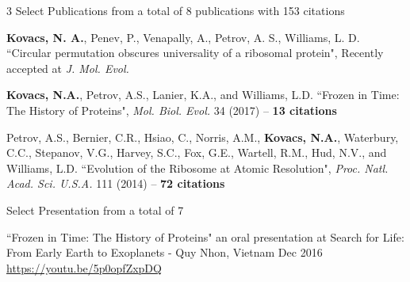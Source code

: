 

\begin{cventries}

  \cventry
  	{3 Select Publications from a total of 8 publications with 153 citations} %
    {} %
    {} %
    {} %
    {\begin{cvitems}
    \item {\bf Kovacs, N. A.}, Penev, P., Venapally, A., Petrov, A. S., Williams, L. D. ``Circular permutation obscures universality of a ribosomal protein",  Recently accepted at \textit{J. Mol. Evol.}
    \item {\bf Kovacs, N.A.}, Petrov, A.S., Lanier, K.A., and Williams, L.D. ``Frozen in Time: The History of Proteins", \textit{Mol. Biol. Evol.} 34 (2017) -- {\bf 13 citations}
    \item Petrov, A.S., Bernier, C.R., Hsiao, C., Norris, A.M., {\bf Kovacs, N.A.}, Waterbury, C.C., Stepanov, V.G., Harvey, S.C., Fox, G.E., Wartell, R.M., Hud, N.V., and Williams, L.D. ``Evolution of the Ribosome at Atomic Resolution", \textit{Proc. Natl. Acad. Sci. U.S.A.} 111 (2014) -- {\bf 72 citations}
    \end{cvitems}
    }
    
  \cventry
  	{Select Presentation from a total of 7} %
    {} %
    {} %
    {} %
    {\begin{cvitems}
    \item ``Frozen in Time: The History of Proteins" an oral presentation at Search for Life: From Early Earth to Exoplanets - Quy Nhon, Vietnam Dec 2016 \\ \href{https://youtu.be/5p0opfZxpDQ}{https://youtu.be/5p0opfZxpDQ}
    \end{cvitems}
    }
    
\vspace{-1em}

\end{cventries}
